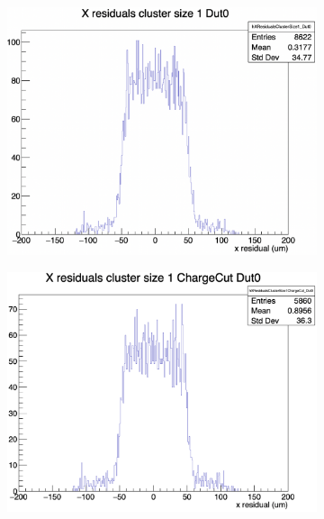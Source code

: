 \begin{figure}[H]
    \centering

    \begin{subfigure}[b]{0.3\textwidth}
        \includegraphics[width=\textwidth]{images/XRes_13plane_size1.png}
        \caption{}
    \end{subfigure}
    \hfill
    \begin{subfigure}[b]{0.33\textwidth}
        \includegraphics[width=\textwidth]{images/XRes_size1_4pixel.png}
        \caption{}
    \end{subfigure}
    \hfill
    \begin{subfigure}[b]{0.3\textwidth}

\end{subfigure}
\end{figure}
